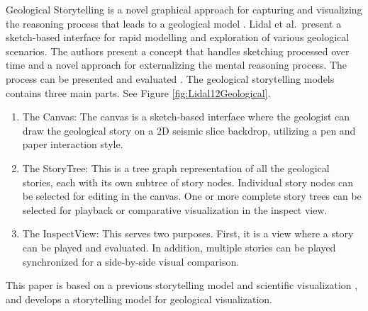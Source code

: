\documentclass{egpubl}
\begin{document}
Geological Storytelling is a novel graphical approach for capturing and visualizing the reasoning process that leads to a geological model \cite{lidal} \cite{Lidal2013}.
Lidal et al.\ present a sketch-based interface for rapid modelling and exploration of various geological scenarios. The authors present a concept that handles sketching processed over time and a novel approach for externalizing the mental reasoning process. The process can be presented and evaluated \cite{lidal}\cite{Lidal2013}.
The geological storytelling models contains three main parts. See Figure \ref{fig:Lidal12Geological}.
\begin{enumerate}
\item The Canvas: The canvas is a sketch-based interface where the geologist can draw the geological story on a 2D seismic slice
backdrop, utilizing a pen and paper interaction style.
\item The StoryTree: This is a tree graph representation of all the geological stories, each with its own subtree of story nodes. Individual story nodes can be selected for editing in the canvas. One or more complete story trees can be selected for playback or comparative visualization in the inspect view.

\item The InspectView: This serves two purposes. First, it is a view where a story can be played and evaluated. In addition,
multiple stories can be played synchronized for a side-by-side visual comparison.

\end{enumerate}
This paper is based on a previous storytelling model \cite{wohlfat} and scientific visualization \cite{sci}, and develops a storytelling model for geological visualization.
\end{document}
